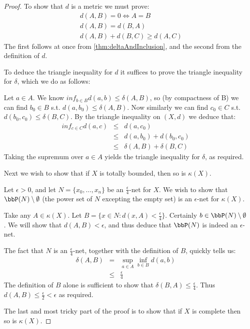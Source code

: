 \documentclass[a4paper,11pt]{article}
\begin{document}
\begin{proof}
To show that $d$ is a metric we must prove:
\begin{eqnarray*}
&&d(A,B)=0 \iff A=B \\
&&d(A,B)=d(B,A) \\
&&d(A,B)+d(B,C)\geq d(A,C)
\end{eqnarray*}
%
The first follows at once from \ref{thm:deltaAndInclusion}, and the second from
the definition of $d$.

To deduce the triangle inequality for $d$ it suffices to prove the triangle
inequality for $\delta$, which we do as follows:

Let $a\in A$.  We know $inf_{b\in B}d(a,b)\leq\delta(A,B)$, so (by compactness
of B) we can find $b_0\in B$ s.t.
$d(a,b_0)\leq\delta(A,B)$.  Now similarly we can
find $c_0\in C$ s.t. $d(b_0,c_0)\leq\delta(B,C)$.
By the triangle inequality on
$(X,d)$ we deduce that:
%
\begin{eqnarray*}
inf_{c\in C}d(a,c)&\leq&d(a,c_0) \\
  &\leq& d(a,b_0)+d(b_0,c_0) \\
  &\leq& \delta(A,B)+\delta(B,C)
\end{eqnarray*}
%
Taking the supremum over $a\in A$ yields the triangle inequality for $\delta$,
as required.

Next we wish to show that if $X$ is totally bounded, then so is $\kappa(X)$.

Let $\epsilon>0$, and let $N=\{x_0,\ldots,x_n\}$ be an $\frac{\epsilon}{4}$-net
for $X$.  We wish to show that
$\bbP(N)\setminus\emptyset$ (the power set of $N$
excepting the empty set) is an
$\epsilon$-net for $\kappa(X)$.

Take any $A\in\kappa(X)$.  Let $B=\{x\in N:d(x,A)<\frac{\epsilon}{4}\}$.
Certainly $b\in\bbP(N)\setminus\emptyset$.  We
will show that $d(A,B)<\epsilon$, and thus deduce that $\bbP(N)$ is indeed an
$\epsilon$-net.

The fact that $N$ is an $\frac{\epsilon}{4}$-net, together with the definition
of $B$, quickly tells us:
%
\begin{eqnarray*}
\delta(A,B)
  &=& \sup_{a\in A}\inf_{b\in B}d(a,b) \\
  &\leq& \frac{\epsilon}{4}
\end{eqnarray*}
%
The definition of $B$ alone is sufficient to show that
$\delta(B,A)\leq\frac{\epsilon}{4}$.  Thus
$d(A,B)\leq\frac{\epsilon}{2}<\epsilon$ as required.

The last and most tricky part of the proof is to show that if $X$ is complete
then so is $\kappa(X)$.


\end{proof}
\end{document}
